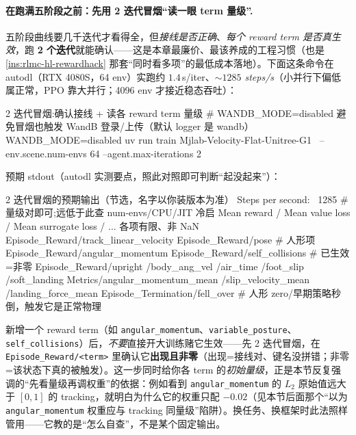 \paragraph{在跑满五阶段之前：先用 2 迭代冒烟“读一眼 term 量级”.}
五阶段曲线要几千迭代才看得全，但\emph{接线是否正确}、\emph{每个 reward term 是否真生效}，跑 \textbf{2 个迭代}就能确认——这是本章最廉价、最该养成的工程习惯（也是 \cref{ins:rlmc-hl-rewardhack} 那套“同时看多项”的最低成本落地）。下面这条命令在 autodl（RTX 4080S，64 env）实跑约 $1.4$\,s/iter、\emph{$\sim 1285$ steps/s}（小并行下偏低属正常，PPO 靠大并行；4096 env 才接近稳态吞吐）：

\begin{codebox}[bash]{2 迭代冒烟:确认接线 + 读各 reward term 量级}
# WANDB_MODE=disabled 避免冒烟也触发 WandB 登录/上传（默认 logger 是 wandb）
WANDB_MODE=disabled uv run train Mjlab-Velocity-Flat-Unitree-G1 \
  --env.scene.num-envs 64 --agent.max-iterations 2
\end{codebox}

\noindent{}预期 stdout（autodl 实测要点，照此对照即可判断“起没起来”）：
\begin{codebox}[text]{2 迭代冒烟的预期输出（节选，名字以你装版本为准）}
Steps per second: ~1285        # 量级对即可;远低于此查 num-envs/CPU/JIT 冷启
Mean reward / Mean value loss / Mean surrogate loss / ... 各项有限、非 NaN
Episode_Reward/track_linear_velocity   Episode_Reward/pose            # 人形项
Episode_Reward/angular_momentum        Episode_Reward/self_collisions # 已生效=非零
Episode_Reward/upright  /body_ang_vel  /air_time  /foot_slip  /soft_landing
Metrics/angular_momentum_mean  /slip_velocity_mean  /landing_force_mean
Episode_Termination/fell_over          # 人形 zero/早期策略秒倒，触发它是正常物理
\end{codebox}

\begin{insight}[“2 迭代读 term” 是定位异常 reward 的通用起手式]\label{ins:rlmc-hl-smoke}
新增一个 reward term（如 \texttt{angular\_momentum}、\texttt{variable\_posture}、\texttt{self\_collisions}）后，\emph{不要}直接开大训练赌它生效——先 2 迭代冒烟，在 \texttt{Episode\_Reward/\allowbreak <term>} 里确认它\textbf{出现且非零}（出现=接线对、键名没拼错；非零=该状态下真的被触发）。这一步同时给你各 term 的\emph{初始量级}，正是本节反复强调的“先看量级再调权重”的依据：例如看到 \texttt{angular\_momentum} 的 $L_2$ 原始值远大于 $[0,1]$ 的 tracking，就明白为什么它的权重只配 $-0.02$（见本节后面那个“以为 \texttt{angular\_momentum} 权重应与 tracking 同量级”陷阱）。换任务、换框架时此法照样管用——它教的是“怎么自查”，不是某个固定输出。
\end{insight}

